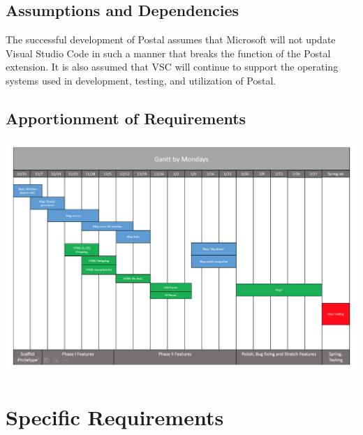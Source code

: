 \documentclass[letterpaper,10pt,titlepage,draftclsnofoot,onecolumn,onesided] {IEEEtran}
\begin{document}
\subsection{Assumptions and Dependencies}
The successful development of Postal assumes that Microsoft will not update Visual Studio Code in such a manner that breaks the function of the Postal extension. It is also assumed that VSC will continue to support the operating systems used in development, testing, and utilization of Postal.

\subsection{Apportionment of Requirements}
\includegraphics[scale=0.7]{gantt.png}

\section{Specific Requirements}
\end{document}
